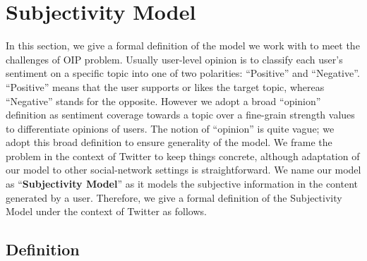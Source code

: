 \documentclass[runningheads,a4paper]{llncs}
\begin{document}
\section{Subjectivity Model}
\label{sec4}

In this section, we give a formal definition of the model we work with to meet the challenges of OIP problem. Usually user-level opinion is to classify each user’s sentiment on a specific topic into one of two polarities: ``Positive'' and ``Negative''. ``Positive'' means that the user supports or likes the target topic, whereas ``Negative'' stands for the opposite. However we adopt a broad ``opinion'' definition as sentiment coverage towards a topic over a fine-grain strength values to differentiate opinions of users. The notion of ``opinion'' is quite vague; we adopt this broad definition to ensure generality of the model. We frame the problem in the context of Twitter to keep things concrete, although adaptation of our model to other social-network settings is straightforward. We name our model as ``\textbf{Subjectivity Model}'' as it models the subjective information in the content generated by a user. Therefore, we give a formal definition of the Subjectivity Model under the context of Twitter as follows.

\subsection{Definition}
\label{definition}
\end{document}
